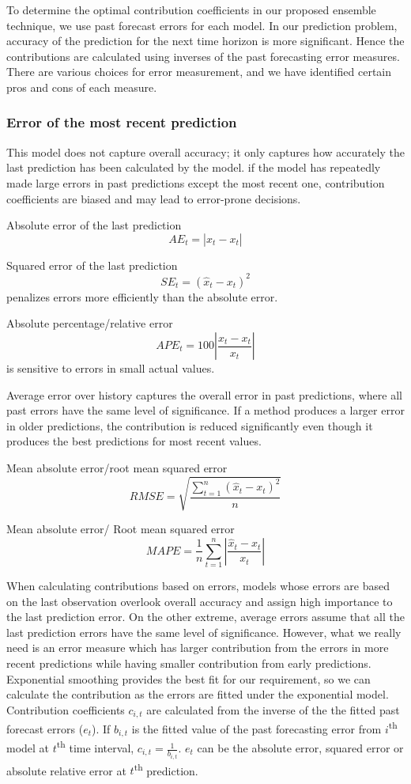 To determine the optimal contribution coefficients in our proposed ensemble technique, we use past forecast errors for each model. In our prediction problem, accuracy of the prediction for the next time horizon is more significant. Hence the contributions are calculated using inverses of the past forecasting error measures. There are various choices for error measurement, and we have identified certain pros and cons of each measure.

\subsubsection{Error of the most recent prediction}

This model does not capture overall accuracy; it only captures how accurately the last prediction has been calculated by the model. if the model has repeatedly made large errors in past predictions except the most recent one, contribution coefficients are biased and may lead to error-prone decisions.

Absolute error of the last prediction
$$AE_t=|\hat{x}_t-x_t|$$

Squared error of the last prediction
$$SE_t=(\hat{x}_t-x_t)^2$$
penalizes errors more efficiently than the absolute error.

Absolute percentage/relative error
$$APE_t=100\left |\frac{\hat{x}_t-x_t}{x_t}  \right |$$
is sensitive to errors in small actual values.

Average error over history captures the overall error in past predictions, where all past errors have the same level of significance. If a method produces a larger error in older predictions, the contribution is reduced significantly even though it produces the best predictions for most recent values.

Mean absolute error/root mean squared error
$$RMSE=\sqrt{\frac{\sum_{t=1}^{n}(\hat{x}_{t}-x_{t})^{2}}{n}}$$ 

Mean absolute error/ Root mean squared error
$$ MAPE=\frac{1}{n}\sum_{t=1}^{n}\left | \frac{\hat{x}_{t}-x_{t}}{x_{t}} \right |$$

When calculating contributions based on errors, models whose errors are based on the last observation overlook overall accuracy and assign high importance to the last prediction error. On the other extreme, average errors assume that all the last prediction errors have the same level of significance. However, what we really need is an error measure which has larger contribution from the errors in more recent predictions while having smaller contribution from early predictions. Exponential smoothing provides the best fit for our requirement, so we can calculate the contribution as the errors are fitted under the exponential model. Contribution coefficients $c_{i,t}$ are calculated from the inverse of the the fitted past forecast errors ($e_{t}$). If $b_{i,t}$ is the fitted value of the past forecasting error from $i$\textsuperscript{th} model at $t$\textsuperscript{th} time interval, 
$c_{i,t}=\frac{1}{b_{i,t}}$. $e_{t}$ can be the absolute error, squared error or absolute relative error at $t$\textsuperscript{th} prediction.


